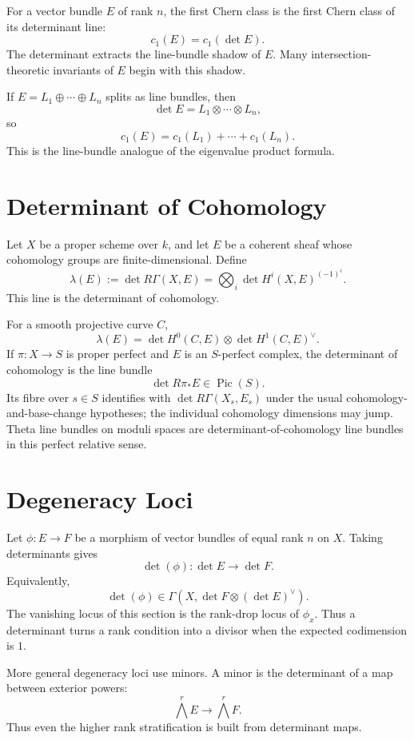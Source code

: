 \documentclass[11pt]{memoir}
\providecommand{\Pic}{\operatorname{Pic}}
\begin{document}
For a vector bundle \(E\) of rank \(n\), the first Chern class is the
first Chern class of its determinant line:
\[
  c_1(E)=c_1(\det E).
\]
The determinant extracts the line-bundle shadow of \(E\). Many
intersection-theoretic invariants of \(E\) begin with this shadow.

If \(E=L_1\oplus\cdots\oplus L_n\) splits as line bundles, then
\[
  \det E=L_1\otimes\cdots\otimes L_n,
\]
so
\[
  c_1(E)=c_1(L_1)+\cdots+c_1(L_n).
\]
This is the line-bundle analogue of the eigenvalue product formula.

\section{Determinant of Cohomology}
\label{sec:det-cohomology-ag}

Let \(X\) be a proper scheme over \(k\), and let \(E\) be a coherent
sheaf whose cohomology groups are finite-dimensional. Define
\[
  \lambda(E)
  :=
  \det R\Gamma(X,E)
  =
  \bigotimes_i \det H^i(X,E)^{(-1)^i}.
\]
This line is the determinant of cohomology.

For a smooth projective curve \(C\),
\[
  \lambda(E)=\det H^0(C,E)\otimes \det H^1(C,E)^\vee.
\]
If \(\pi:X\to S\) is proper perfect and \(E\) is an \(S\)-perfect
complex, the determinant of cohomology is the line bundle
\[
  \det R\pi_*E\in\Pic(S).
\]
Its fibre over \(s\in S\) identifies with \(\det R\Gamma(X_s,E_s)\)
under the usual cohomology-and-base-change hypotheses; the individual
cohomology dimensions may jump. Theta line bundles on moduli spaces
are determinant-of-cohomology line bundles in this perfect relative
sense.

\section{Degeneracy Loci}
\label{sec:degeneracy}

Let \(\phi:E\to F\) be a morphism of vector bundles of equal rank
\(n\) on \(X\). Taking determinants gives
\[
  \det(\phi):\det E\to\det F.
\]
Equivalently,
\[
  \det(\phi)\in\Gamma(X,\det F\otimes(\det E)^\vee).
\]
The vanishing locus of this section is the rank-drop locus of
\(\phi_x\). Thus a determinant turns a rank condition into a
divisor when the expected codimension is \(1\).

More general degeneracy loci use minors. A minor is the determinant of
a map between exterior powers:
\[
  \bigwedge^r E\to \bigwedge^r F.
\]
Thus even the higher rank stratification is built from determinant
maps.
\end{document}
